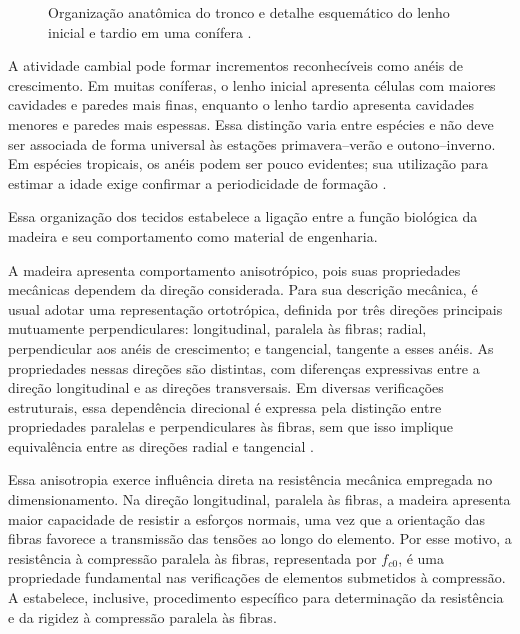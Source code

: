 \begin{figure}[htbp]
\centering

\caption{Organização anatômica do tronco e detalhe esquemático do lenho inicial e tardio em uma conífera \parencite{WiedenhoeftEberhardt2021}.}
\label{fig:anatomia_madeira}
\end{figure}

A atividade cambial pode formar incrementos reconhecíveis como anéis de crescimento.
Em muitas coníferas, o lenho inicial apresenta células com maiores cavidades e paredes mais finas, enquanto o lenho tardio apresenta cavidades menores e paredes mais espessas.
Essa distinção varia entre espécies e não deve ser associada de forma universal às estações primavera--verão e outono--inverno.
Em espécies tropicais, os anéis podem ser pouco evidentes; sua utilização para estimar a idade exige confirmar a periodicidade de formação \parencite{WiedenhoeftEberhardt2021}.

Essa organização dos tecidos estabelece a ligação entre a função biológica da madeira e seu comportamento como material de engenharia.

A madeira apresenta comportamento anisotrópico, pois suas
propriedades mecânicas dependem da direção considerada.
Para sua descrição mecânica, é usual adotar uma representação
ortotrópica, definida por três direções principais mutuamente
perpendiculares: longitudinal, paralela às fibras; radial,
perpendicular aos anéis de crescimento; e tangencial, tangente
a esses anéis. As propriedades nessas direções são distintas,
com diferenças expressivas entre a direção longitudinal e as
direções transversais. Em diversas verificações estruturais,
essa dependência direcional é expressa pela distinção entre
propriedades paralelas e perpendiculares às fibras, sem que
isso implique equivalência entre as direções radial e
tangencial \parencite{SenalikFarber2021}.

Essa anisotropia exerce influência direta na resistência mecânica empregada no
dimensionamento. Na direção longitudinal, paralela às fibras, a madeira apresenta
maior capacidade de resistir a esforços normais, uma vez que a orientação das
fibras favorece a transmissão das tensões ao longo do elemento. Por esse motivo,
a resistência à compressão paralela às fibras, representada por $f_{c0}$, é uma
propriedade fundamental nas verificações de elementos submetidos à compressão.
A \textcite{ABNT-NBR7190-3:2022} estabelece, inclusive, procedimento específico para
determinação da resistência e da rigidez à compressão paralela às fibras.

